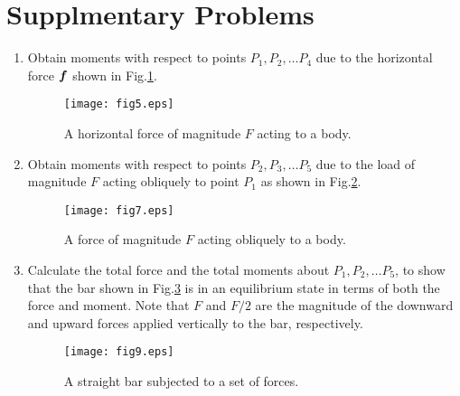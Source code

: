 \documentclass[10pt,a4j]{article}
\begin{document}
\section{Supplmentary Problems}
\begin{enumerate}
\item
	Obtain moments with respect to points $P_1,P_2,\dots P_4$ due to 
	the horizontal force $\mbox{\boldmath $f$}$ shown in Fig.\ref{fig:fig5}. 
	\begin{figure}[h]
		\begin{center}
		\texttt{[image: fig5.eps]} 
		\end{center}
		\caption{A horizontal force of magnitude $F$ acting to a body.} 
		\label{fig:fig5}
	\end{figure}
\item
	Obtain moments with respect to points $P_2,P_3,\dots P_5$
	due to the load of magnitude $F$ acting obliquely to 
	point $P_1$ as shown in Fig.\ref{fig:fig7}.
	\begin{figure}[h]
		\begin{center}
		\texttt{[image: fig7.eps]} 
		\end{center}
		\caption{A force of magnitude $F$ acting obliquely to a body.} 
		\label{fig:fig7}
	\end{figure}
\item
	Calculate the total force and the total moments about $P_1, P_2,\dots P_5$, 
	to show that the bar shown in Fig.\ref{fig:fig9} is in an equilibrium state 
	in terms of both the force and moment. 
	Note that $F$ and $F/2$ are the magnitude of the downward and upward forces 
	applied vertically to the bar, respectively.
	\begin{figure}[h]
		\begin{center}
		\texttt{[image: fig9.eps]} 
		\end{center}
		\caption{A straight bar subjected to a set of forces.} 
		\label{fig:fig9}
	\end{figure}
\end{enumerate}
\end{document}
